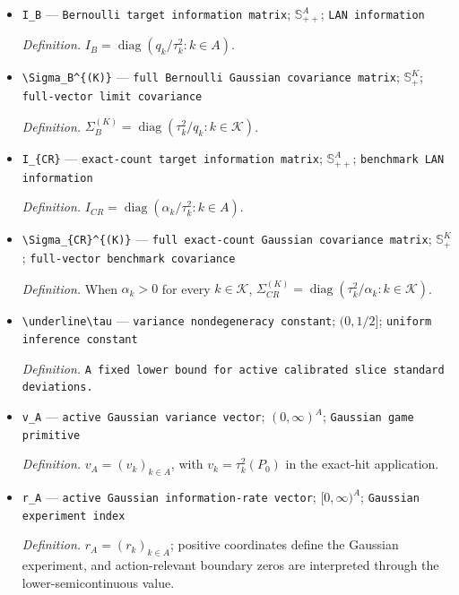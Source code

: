 \documentclass{article}
\begin{document}
\begin{itemize}
  \item \texttt{I\_\allowbreak{}B} --- \texttt{Bernoulli target information matrix}; \(\mathbb S_{++}^{A}\); \texttt{LAN information}
  \par\smallskip\noindent\emph{Definition.} \(I_B=\operatorname{diag}(q_k/\tau_k^2:k\in A)\).
  \item \texttt{\textbackslash{}\allowbreak{}Sigma\_\allowbreak{}B\textasciicircum{}\{(K)\}\allowbreak{}} --- \texttt{full Bernoulli Gaussian covariance matrix}; \(\mathbb S_+^K\); \texttt{full-\allowbreak{}vector limit covariance}
  \par\smallskip\noindent\emph{Definition.} \(\Sigma_B^{(K)}=\operatorname{diag}(\tau_k^2/q_k:k\in\mathcal K)\).
  \item \texttt{I\_\allowbreak{}\{CR\}\allowbreak{}} --- \texttt{exact-\allowbreak{}count target information matrix}; \(\mathbb S_{++}^{A}\); \texttt{benchmark LAN information}
  \par\smallskip\noindent\emph{Definition.} \(I_{CR}=\operatorname{diag}(\alpha_k/\tau_k^2:k\in A)\).
  \item \texttt{\textbackslash{}\allowbreak{}Sigma\_\allowbreak{}\{CR\}\allowbreak{}\textasciicircum{}\{(K)\}\allowbreak{}} --- \texttt{full exact-\allowbreak{}count Gaussian covariance matrix}; \(\mathbb S_+^K\); \texttt{full-\allowbreak{}vector benchmark covariance}
  \par\smallskip\noindent\emph{Definition.} When \(\alpha_k>0\) for every \(k\in\mathcal K\), \(\Sigma_{CR}^{(K)}=\operatorname{diag}(\tau_k^2/\alpha_k:k\in\mathcal K)\).
  \item \texttt{\textbackslash{}\allowbreak{}underline\textbackslash{}\allowbreak{}tau} --- \texttt{variance nondegeneracy constant}; \((0,1/2]\); \texttt{uniform inference constant}
  \par\smallskip\noindent\emph{Definition.} \texttt{A fixed lower bound for active calibrated slice standard deviations.}
  \item \texttt{v\_\allowbreak{}A} --- \texttt{active Gaussian variance vector}; \((0,\infty)^A\); \texttt{Gaussian game primitive}
  \par\smallskip\noindent\emph{Definition.} \(v_A=(v_k)_{k\in A}\), with \(v_k=\tau_k^2(P_0)\) in the exact-hit application.
  \item \texttt{r\_\allowbreak{}A} --- \texttt{active Gaussian information-\allowbreak{}rate vector}; \([0,\infty)^A\); \texttt{Gaussian experiment index}
  \par\smallskip\noindent\emph{Definition.} \(r_A=(r_k)_{k\in A}\); positive coordinates define the Gaussian experiment, and action-relevant boundary zeros are interpreted through the lower-semicontinuous value.

\end{itemize}
\end{document}
